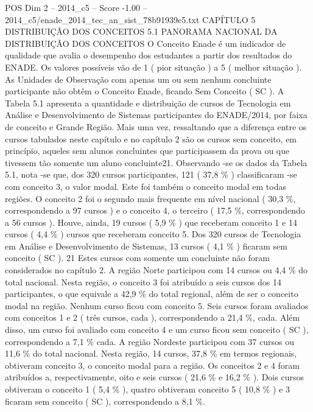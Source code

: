 \begin{textsample}{POS Dim 2 – 2014\_c5 – Score -1.00 – 2014\_c5/enade\_2014\_tec\_an\_sist\_78b91939e5.txt}  \label{ex:f2_pos_307}
CAPÍTULO 5 DISTRIBUIÇÃO DOS CONCEITOS 5.1 PANORAMA NACIONAL DA DISTRIBUIÇÃO DOS CONCEITOS O Conceito Enade é um indicador de qualidade que avalia o desempenho dos estudantes a partir dos resultados do ENADE.
Os valores possíveis vão de 1 ( pior situação ) a 5 ( melhor situação ).
As Unidades de Observação com apenas um ou sem nenhum concluinte participante não obtêm o Conceito Enade, ficando Sem Conceito ( SC ).
A Tabela 5.1 apresenta a quantidade e distribuição de cursos de Tecnologia em Análise e Desenvolvimento de Sistemas participantes do ENADE/2014, por faixa de conceito e Grande Região.
Mais uma vez, ressaltando que a diferença entre os cursos tabulados neste capítulo e no capítulo 2 são os cursos sem conceito, em princípio, aqueles sem alunos concluintes que participassem da prova ou que tivessem tão somente um aluno concluinte21.
Observando -se os dados da Tabela 5.1, nota -se que, dos 320 cursos participantes, 121 ( 37,8 \% ) classificaram -se com conceito 3, o valor modal.
Este foi também o conceito modal em todas regiões.
O conceito 2 foi o segundo mais frequente em nível nacional ( 30,3 \%, correspondendo a 97 cursos ) e o conceito 4, o terceiro ( 17,5 \%, correspondendo a 56 cursos ).
Houve, ainda, 19 cursos ( 5,9 \% ) que receberam conceito 1 e 14 cursos ( 4,4 \% ) cursos que receberam conceito 5.
Dos 320 cursos de Tecnologia em Análise e Desenvolvimento de Sistemas, 13 cursos ( 4,1 \% ) ficaram sem conceito ( SC ). 21 Estes cursos com somente um concluinte não foram considerados no capítulo 2.
A região Norte participou com 14 cursos ou 4,4 \% do total nacional.
Nesta região, o conceito 3 foi atribuído a seis cursos dos 14 participantes, o que equivale a 42,9 \% do total regional, além de ser o conceito modal na região.
Nenhum curso ficou com conceito 5.
Seis cursos foram avaliados com conceitos 1 e 2 ( três cursos, cada ), correspondendo a 21,4 \%, cada.
Além disso, um curso foi avaliado com conceito 4 e um curso ficou sem conceito ( SC ), correspondendo a 7,1 \% cada.
A região Nordeste participou com 37 cursos ou 11,6 \% do total nacional.
Nesta região, 14 cursos, 37,8 \% em termos regionais, obtiveram conceito 3, o conceito modal para a região.
Os conceitos 2 e 4 foram atribuídos a, respectivamente, oito e seis cursos ( 21,6 \% e 16,2 \% ).
Dois cursos obtiveram o conceito 1 ( 5,4 \% ), quatro obtiveram conceito 5 ( 10,8 \% ) e 3 ficaram sem conceito ( SC ), correspondendo a 8,1 \%.

\end{textsample}
